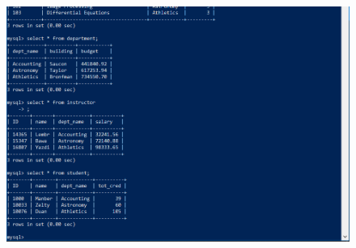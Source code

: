 \documentclass[]{article}
\begin{document}
\begin{figure}[htbp]
\centering
\includegraphics{tablas2.png}
\end{figure}
\end{document}
